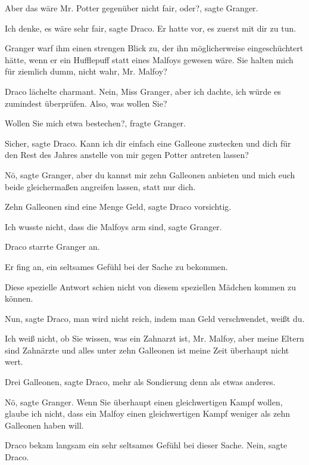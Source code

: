 \glqq{}Aber das wäre Mr. Potter gegenüber nicht fair, oder?\grqq{}, sagte
Granger.

\glqq{}Ich denke, es wäre sehr fair\grqq{}, sagte Draco. \glqq{}Er hatte vor, es
zuerst mit dir zu tun.\grqq{}

Granger warf ihm einen strengen Blick zu, der ihn möglicherweise eingeschüchtert
hätte, wenn er ein Hufflepuff statt eines Malfoys gewesen wäre. \glqq{}Sie
halten mich für ziemlich dumm, nicht wahr, Mr. Malfoy?\grqq{}

Draco lächelte charmant. \glqq{}Nein, Miss Granger, aber ich dachte, ich würde
es zumindest überprüfen. Also, was wollen Sie?\grqq{}

\glqq{}Wollen Sie mich etwa bestechen?\grqq{}, fragte Granger.

\glqq{}Sicher\grqq{}, sagte Draco. \glqq{}Kann ich dir einfach eine Galleone
zustecken und dich für den Rest des Jahres anstelle von mir gegen Potter
antreten lassen?\grqq{}

\glqq{}Nö\grqq{}, sagte Granger, \glqq{}aber du kannst mir zehn Galleonen
anbieten und mich euch beide gleichermaßen angreifen lassen, statt nur
dich.\grqq{}

\glqq{}Zehn Galleonen sind eine Menge Geld\grqq{}, sagte Draco vorsichtig.

\glqq{}Ich wusste nicht, dass die Malfoys arm sind\grqq{}, sagte Granger.

Draco starrte Granger an.

Er fing an, ein seltsames Gefühl bei der Sache zu bekommen.

Diese spezielle Antwort schien nicht von diesem speziellen Mädchen kommen zu
können.

\glqq{}Nun\grqq{}, sagte Draco, \glqq{}man wird nicht reich, indem man Geld
verschwendet, weißt du.\grqq{}

\glqq{}Ich weiß nicht, ob Sie wissen, was ein Zahnarzt ist, Mr. Malfoy, aber
meine Eltern sind Zahnärzte und alles unter zehn Galleonen ist meine Zeit
überhaupt nicht wert.\grqq{}

\glqq{}Drei Galleonen\grqq{}, sagte Draco, mehr als Sondierung denn als etwas
anderes.

\glqq{}Nö\grqq{}, sagte Granger. \glqq{}Wenn Sie überhaupt einen gleichwertigen
Kampf wollen, glaube ich nicht, dass ein Malfoy einen gleichwertigen Kampf
weniger als zehn Galleonen haben will.\grqq{}

Draco bekam langsam ein sehr seltsames Gefühl bei dieser Sache.
\glqq{}Nein\grqq{}, sagte Draco.

